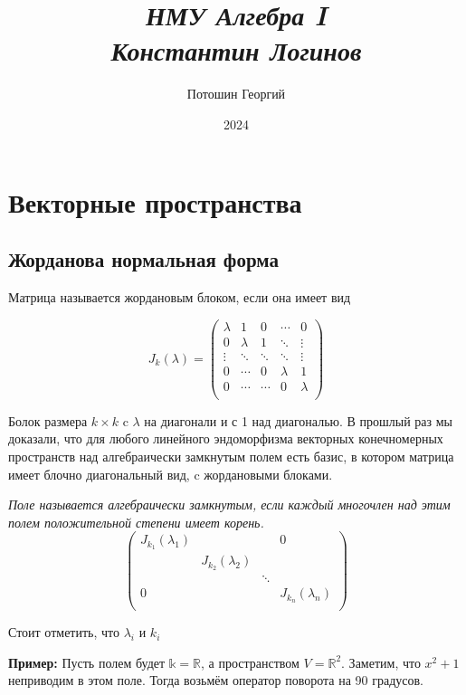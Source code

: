 \documentclass[a4paper, 12pt]{book}
\title{
\textit{\huge{НМУ Алгебра I\\Константин Логинов}}
}
\date{2024}
\author{Потошин Георгий}
\begin{document}
\maketitle
\chapter{Векторные пространства}
\section{Жорданова нормальная форма}
Матрица называется жордановым блоком, если она имеет вид

\[J_k(\lambda)=\left(\begin{array}{ccccc}
    \lambda & 1       & 0      & \cdots  & 0\\
    0       & \lambda & 1      & \ddots  & \vdots\\
    \vdots  & \ddots  & \ddots & \ddots  & \vdots\\
    0       & \cdots  & 0      & \lambda & 1\\
    0       & \cdots  & \cdots & 0       & \lambda\\
\end{array}\right)\]

Болок размера $k\times k$ c $\lambda$ на диагонали и с 1 над диагональю. В
прошлый раз мы доказали, что для любого линейного эндоморфизма векторных
конечномерных пространств над алгебраически замкнутым полем есть базис, в
котором матрица имеет блочно диагональный вид, c жордановыми блоками.

\textit{Поле называется алгебраически замкнутым, если каждый многочлен над этим
полем положительной степени имеет корень.}
\[
    \left(\begin{array}{cccc}
        J_{k_1}(\lambda_1) &                    &        & 0\\
                           & J_{k_2}(\lambda_2) &        & \\
                           &                    & \ddots & \\
        0                  &                    &        & J_{k_n}(\lambda_n)\\
    \end{array}\right)
\]

Стоит отметить, что $\lambda_i$ и $k_i$

\textbf{Пример:} Пусть полем будет $\mathbb{k}=\mathbb{R}$, а пространством
$V=\mathbb{R}^2$. Заметим, что $x^2+1$ неприводим в этом поле. Тогда возьмём
оператор поворота на 90 градусов.
\end{document}
